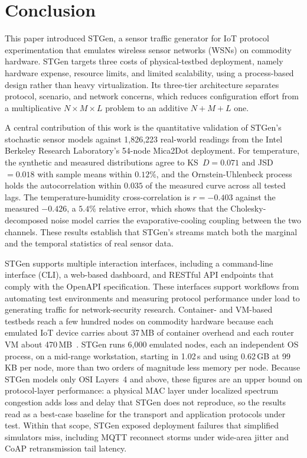 \documentclass[jsan,article,submit,moreauthors,pdftex]{Definitions/mdpi}
\begin{document}
\section{Conclusion}
\label{sec:conclusion}

This paper introduced STGen, a sensor traffic generator for {IoT} protocol experimentation that emulates wireless sensor networks (WSNs) on commodity hardware. STGen targets three costs of physical-testbed deployment, namely hardware expense, resource limits, and limited scalability, using a process-based design rather than heavy virtualization. Its three-tier architecture separates protocol, scenario, and network concerns, which reduces configuration effort from a multiplicative $N \times M \times L$ problem to an additive $N + M + L$ one.

A central contribution of this work is the quantitative validation of STGen's stochastic sensor models against 1,826,223 real-world readings from the Intel Berkeley Research Laboratory's 54-node Mica2Dot deployment. For temperature, the synthetic and measured distributions agree to KS~$D = 0.071$ and JSD~$= 0.018$ with sample means within $0.12\%$, and the Ornstein-Uhlenbeck process holds the autocorrelation within $0.035$ of the measured curve across all tested lags. The temperature-humidity cross-correlation is $r = -0.403$ against the measured $-0.426$, a $5.4\%$ relative error, which shows that the Cholesky-decomposed noise model carries the evaporative-cooling coupling between the two channels. These results establish that STGen's streams match both the marginal and the temporal statistics of real sensor data.

STGen supports multiple interaction interfaces, including a command-line interface (CLI), a web-based dashboard, and RESTful API endpoints that comply with the OpenAPI specification. These interfaces support workflows from automating test environments and measuring protocol performance under load to generating traffic for network-security research. Container- and VM-based testbeds reach a few hundred nodes on commodity hardware because each emulated IoT device carries about 37\,MB of container overhead and each router VM about 470\,MB~\cite{poisson2024gothx}. STGen runs 6{,}000 emulated nodes, each an independent OS process, on a mid-range workstation, starting in 1.02\,s and using 0.62\,GB at 99\,KB per node, more than two orders of magnitude less memory per node. Because STGen models only OSI Layers~4 and above, these figures are an upper bound on protocol-layer performance: a physical MAC layer under localized spectrum congestion adds loss and delay that STGen does not reproduce, so the results read as a best-case baseline for the transport and application protocols under test. Within that scope, STGen exposed deployment failures that simplified simulators miss, including MQTT reconnect storms under wide-area jitter and CoAP retransmission tail latency.
\end{document}
